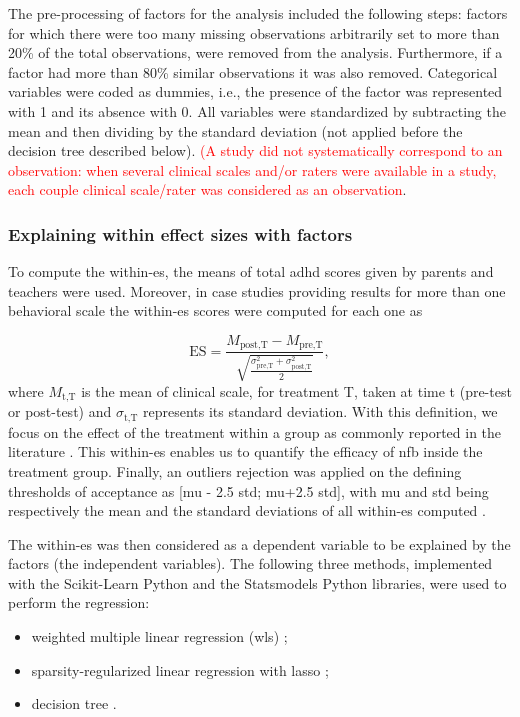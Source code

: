 The pre-processing of factors for the analysis included the following steps: factors for which there were too many 
missing observations arbitrarily set to more than 20\% of the total observations, were removed from the analysis. 
Furthermore, if a factor had more than 80\% similar observations it was also removed. Categorical variables were 
coded as dummies, i.e., the presence of the factor was represented with 1 and its absence with 0. All variables 
were standardized by subtracting the mean and then dividing by the standard deviation (not applied before the decision tree described below).
\textcolor{red}{(A study did not systematically correspond to an observation: when several clinical scales and/or raters were available in a study, each 
couple clinical scale/rater was considered as an observation}.

\subsubsection{Explaining within effect sizes with factors}

To compute the within-\gls{es}, the  means of total \gls{adhd} scores given by parents and teachers were used. Moreover, 
in case studies providing results for more than one behavioral scale the within-\gls{es} scores were computed for each one as 

\begin{equation*}
\label{eq:factors_effect_size_within_subject}
\text{ES} = \frac{M_{\text{post,T}} - M_{\text{pre,T}}}{\sqrt{\frac{\sigma_{\text{pre,T}}^2 + \sigma_{\text{post,T}}^2}{2}}},
\end{equation*} 
\noindent where $M_{\text{t,T}}$ is the mean of clinical scale, for treatment T, taken at time t (pre-test or post-test) and $\sigma_{\text{t,T}}$ represents 
its standard deviation. With this definition, we focus on the effect of the treatment within a group \citep{Cohen1988} as commonly reported 
in the literature \citep{Arns2009, Maurizio2014, Strehl2017}. This within-\gls{es} enables us to quantify 
the efficacy of \gls{nfb} inside the treatment group. Finally, an outliers rejection was applied on the defining thresholds of acceptance as 
[mu - 2.5 std; mu+2.5 std], with mu and std being respectively the mean and the standard deviations of all within-\gls{es} computed \citep{Shewhart1931}.

The within-\gls{es} was then considered as a dependent variable to be explained by the factors (the independent variables). 
The following three methods, implemented with the Scikit-Learn Python \citep[version 0.18.1]{Pedregosa2011} and the Statsmodels Python
\citep[version 0.8.0]{Seabold2010} libraries, were used to perform the regression:
\begin{itemize}
  \item weighted multiple linear regression (\gls{wls}) \citep{Montgomery2012};
	\item sparsity-regularized linear regression with \gls{lasso} \citep{Tibshirani1996};
	\item decision tree \citep{Quinlan1986}.
\end{itemize}

